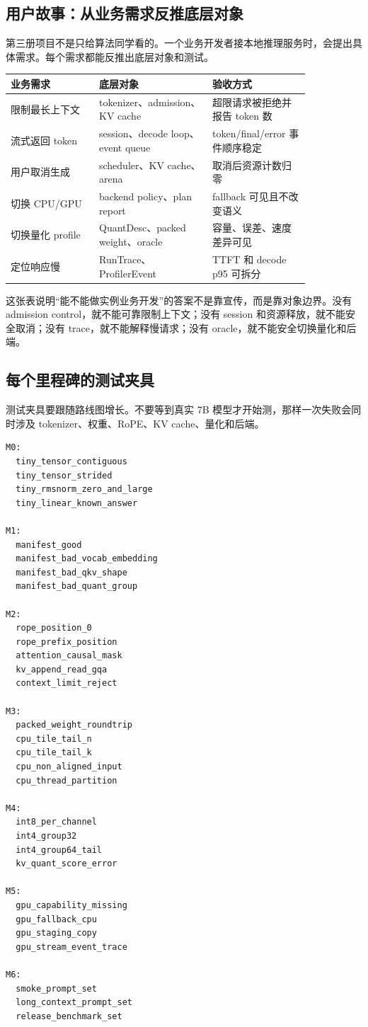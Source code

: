 \subsection{用户故事：从业务需求反推底层对象}

第三册项目不是只给算法同学看的。一个业务开发者接本地推理服务时，会提出具体需求。每个需求都能反推出底层对象和测试。

\begin{center}
\begin{tabular}{p{0.25\linewidth}p{0.32\linewidth}p{0.27\linewidth}}
\toprule
业务需求 & 底层对象 & 验收方式 \\
\midrule
限制最长上下文 & tokenizer、admission、KV cache & 超限请求被拒绝并报告 token 数 \\
流式返回 token & session、decode loop、event queue & token/final/error 事件顺序稳定 \\
用户取消生成 & scheduler、KV cache、arena & 取消后资源计数归零 \\
切换 CPU/GPU & backend policy、plan report & fallback 可见且不改变语义 \\
切换量化 profile & QuantDesc、packed weight、oracle & 容量、误差、速度差异可见 \\
定位响应慢 & RunTrace、ProfilerEvent & TTFT 和 decode p95 可拆分 \\
\bottomrule
\end{tabular}
\end{center}

这张表说明“能不能做实例业务开发”的答案不是靠宣传，而是靠对象边界。没有 admission control，就不能可靠限制上下文；没有 session 和资源释放，就不能安全取消；没有 trace，就不能解释慢请求；没有 oracle，就不能安全切换量化和后端。

\subsection{每个里程碑的测试夹具}

测试夹具要跟随路线图增长。不要等到真实 7B 模型才开始测，那样一次失败会同时涉及 tokenizer、权重、RoPE、KV cache、量化和后端。

\begin{lstlisting}[numbers=none,caption={夹具增长路线}]
M0:
  tiny_tensor_contiguous
  tiny_tensor_strided
  tiny_rmsnorm_zero_and_large
  tiny_linear_known_answer

M1:
  manifest_good
  manifest_bad_vocab_embedding
  manifest_bad_qkv_shape
  manifest_bad_quant_group

M2:
  rope_position_0
  rope_prefix_position
  attention_causal_mask
  kv_append_read_gqa
  context_limit_reject

M3:
  packed_weight_roundtrip
  cpu_tile_tail_n
  cpu_tile_tail_k
  cpu_non_aligned_input
  cpu_thread_partition

M4:
  int8_per_channel
  int4_group32
  int4_group64_tail
  kv_quant_score_error

M5:
  gpu_capability_missing
  gpu_fallback_cpu
  gpu_staging_copy
  gpu_stream_event_trace

M6:
  smoke_prompt_set
  long_context_prompt_set
  release_benchmark_set
\end{lstlisting}

